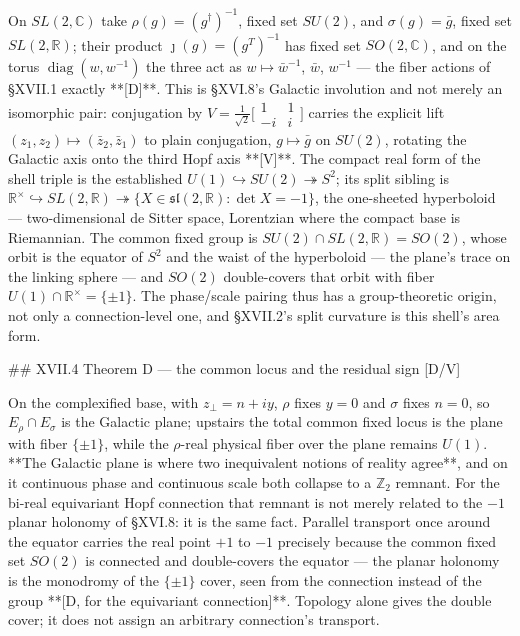 On $SL(2,\mathbb C)$ take $\rho(g) = (g^\dagger)^{-1}$, fixed set $SU(2)$, and $\sigma(g) = \bar g$, fixed set $SL(2,\mathbb R)$; their product $\jmath(g) = (g^T)^{-1}$ has fixed set $SO(2,\mathbb C)$, and on the torus $\operatorname{diag}(w,w^{-1})$ the three act as $w\mapsto\bar w^{-1}$, $\bar w$, $w^{-1}$ — the fiber actions of §XVII.1 exactly **[D]**. This is §XVI.8's Galactic involution and not merely an isomorphic pair: conjugation by $V = \tfrac1{\sqrt2}\big[\begin{smallmatrix}1&1\\-i&i\end{smallmatrix}\big]$ carries the explicit lift $(z_1,z_2)\mapsto(\bar z_2,\bar z_1)$ to plain conjugation, $g\mapsto\bar g$ on $SU(2)$, rotating the Galactic axis onto the third Hopf axis **[V]**. The compact real form of the shell triple is the established $U(1)\hookrightarrow SU(2)\twoheadrightarrow S^2$; its split sibling is $\mathbb R^\times\hookrightarrow SL(2,\mathbb R)\twoheadrightarrow\{X\in\mathfrak{sl}(2,\mathbb R):\det X = -1\}$, the one-sheeted hyperboloid — two-dimensional de Sitter space, Lorentzian where the compact base is Riemannian. The common fixed group is $SU(2)\cap SL(2,\mathbb R) = SO(2)$, whose orbit is the equator of $S^2$ and the waist of the hyperboloid — the plane's trace on the linking sphere — and $SO(2)$ double-covers that orbit with fiber $U(1)\cap\mathbb R^\times = \{\pm1\}$. The phase/scale pairing thus has a group-theoretic origin, not only a connection-level one, and §XVII.2's split curvature is this shell's area form.

## XVII.4 Theorem D — the common locus and the residual sign [D/V]

On the complexified base, with $z_\perp = n+iy$, $\rho$ fixes $y = 0$ and $\sigma$ fixes $n = 0$, so $E_\rho\cap E_\sigma$ is the Galactic plane; upstairs the total common fixed locus is the plane with fiber $\{\pm1\}$, while the $\rho$-real physical fiber over the plane remains $U(1)$. **The Galactic plane is where two inequivalent notions of reality agree**, and on it continuous phase and continuous scale both collapse to a $\mathbb Z_2$ remnant. For the bi-real equivariant Hopf connection that remnant is not merely related to the $-1$ planar holonomy of §XVI.8: it is the same fact. Parallel transport once around the equator carries the real point $+1$ to $-1$ precisely because the common fixed set $SO(2)$ is connected and double-covers the equator — the planar holonomy is the monodromy of the $\{\pm1\}$ cover, seen from the connection instead of the group **[D, for the equivariant connection]**. Topology alone gives the double cover; it does not assign an arbitrary connection's transport.

